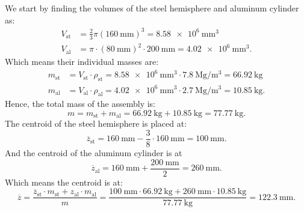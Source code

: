\begin{derivation}
  We start by finding the volumes of the steel hemisphere and aluminum cylinder as:
  \begin{align*}
    V_{\mathrm{st}} &= \frac{2}{3} \pi \left( \qty{160}{\mm}  \right)^3 = \qty{8,58e6}{\mm^3}\\
    V_{\mathrm{al}} &= \pi \cdot \left( \qty{80}{\mm}  \right)^2 \cdot \qty{200}{\mm} = \qty{4,02e6}{\mm^3} 
  .\end{align*}
  Which means their individual masses are:
  \begin{align*}
    m_{\mathrm{st}} &= V_{\mathrm{st}} \cdot \rho_{\mathrm{st}} = \qty{8,58e6}{\mm^3} \cdot \qty{7,8}{\mega\g\per\m^3} = \qty{66,92}{\kg}  \\
    m_{\mathrm{al}} &= V_{\mathrm{al}} \cdot \rho_{\mathrm{al}} = \qty{4,02e6}{\mm^3} \cdot \qty{2,7}{\mega\g\per\m^3} = \qty{10,85}{\kg} 
  .\end{align*}
  Hence, the total mass of the assembly is:
  \begin{equation*}
    m = m_{\mathrm{st}} + m_{\mathrm{al}} = \qty{66.92}{\kg} + \qty{10.85}{\kg}  = \qty{77.77}{\kg}
  .\end{equation*}
  The centroid of the steel hemisphere is placed at:
  \begin{equation*}
    \overline{z}_{\mathrm{st}} = \qty{160}{\mm} - \frac{3}{8} \cdot \qty{160}{\mm}  = \qty{100}{\mm}
  .\end{equation*}
  And the centroid of the aluminum cylinder is at
  \begin{equation*}
    \overline{z}_{\mathrm{al}} = \qty{160}{\mm} + \frac{\qty{200}{\mm} }{2} = \qty{260}{\mm} 
  .\end{equation*}
  Which means the centroid is at:
  \begin{equation*}
    \overline{z} = \frac{\overline{z}_{\mathrm{st}} \cdot m_{\mathrm{st}} + z_{\mathrm{al}} \cdot m_{\mathrm{al}}}{m} = \frac{\qty{100}{\mm} \cdot \qty{66.92}{\kg} + \qty{260}{\mm} \cdot \qty{10.85}{\kg}}{\qty{77.77}{\kg} } = \qty{122,3}{\mm}
  .\end{equation*}
\end{derivation}

